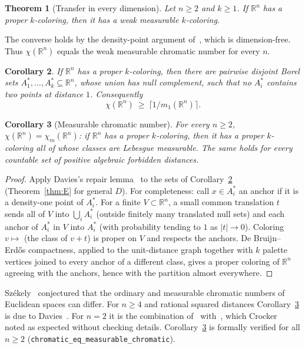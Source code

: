 \documentclass[11pt]{amsart}
\newtheorem{theorem}{Theorem}[section]
\newtheorem{corollary}[theorem]{Corollary}
\theoremstyle{definition}
\newcommand{\R}{\mathbb{R}}
\begin{document}
\begin{theorem}[Transfer in every dimension]\label{thm:A}
Let $n\ge2$ and $k\ge1$. If $\R^n$ has a proper $k$-coloring, then it has a weak measurable $k$-coloring.
\end{theorem}

The converse holds by the density-point argument of~\cite[Lemma 4.3 and proof of Theorem 1.3]{OAI}, which is dimension-free. Thus $\chi(\R^n)$ equals the weak measurable chromatic number for every $n$.

\begin{corollary}\label{cor:B}
If $\R^n$ has a proper $k$-coloring, then there are pairwise disjoint Borel sets $A_1^*,\dots,A_k^*\subseteq\R^n$, whose union has null complement, such that no $A_i^*$ contains two points at distance $1$. Consequently
\[
\chi(\R^n)\ \ge\ \lceil 1/m_1(\R^n)\rceil .
\]
\end{corollary}

\begin{corollary}[Measurable chromatic number]\label{cor:meas}
For every $n\ge2$, $\chi(\R^n)=\chi_m(\R^n)$: if $\R^n$ has a proper $k$-coloring, then it has a proper $k$-coloring all of whose classes are Lebesgue measurable. The same holds for every countable set of positive algebraic forbidden distances.
\end{corollary}

\begin{proof}
Apply Davies's repair lemma~\cite[Lemma B.1]{Davies} to the sets of Corollary~\ref{cor:B} (Theorem~\ref{thm:E} for general $D$). For completeness: call $x\in A_i^*$ an anchor if it is a density-one point of $A_i^*$. For a finite $V\subset\R^n$, a small common translation $t$ sends all of $V$ into $\bigcup_iA_i^*$ (outside finitely many translated null sets) and each anchor of $A_i^*$ in $V$ into $A_i^*$ (with probability tending to $1$ as $|t|\to0$). Coloring $v\mapsto$ (the class of $v+t$) is proper on $V$ and respects the anchors. De Bruijn--Erd\H{o}s compactness, applied to the unit-distance graph together with $k$ palette vertices joined to every anchor of a different class, gives a proper coloring of $\R^n$ agreeing with the anchors, hence with the partition almost everywhere.
\end{proof}

Sz\'ekely~\cite{Szekely} conjectured that the ordinary and measurable chromatic numbers of Euclidean spaces can differ. For $n\ge4$ and rational squared distances Corollary~\ref{cor:meas} is due to Davies~\cite{Davies}. For $n=2$ it is the combination of~\cite[Lemma B.1]{Davies} with~\cite[Theorem 1.3]{OAI}, which Crocker~\cite{Crocker} noted as expected without checking details. Corollary~\ref{cor:meas} is formally verified for all $n\ge2$ (\texttt{chromatic\_eq\_measurable\_chromatic}).
\end{document}
